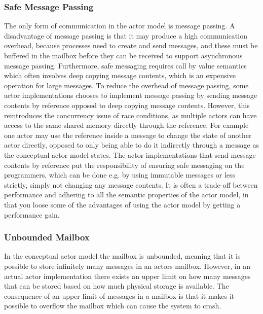 \subsubsection{Safe Message Passing}\label{sssec:safe_msg_passing}
The only form of communication in the actor model is message passing. A disadvantage of message passing is that it may produce a high communication overhead, because processes need to create and send messages, and these must be buffered in the mailbox before they can be received to support asynchronous message passing\cite[p. 17]{haller2012actors}. Furthermore, safe messaging requires call by value semantics which often involves deep copying message contents, which is an expensive operation for large messages. To reduce the overhead of message passing, some actor implementations chooses to implement message passing by sending message contents by reference opposed to deep copying message contents. However, this reintroduces the concurrency issue of race conditions, as multiple actors can have access to the same shared memory directly through the reference. For example one actor may use the reference inside a message to change the state of another actor directly, opposed to only being able to do it indirectly through a message as the conceptual actor model states. The actor implementations that send message contents by reference put the responsibility of ensuring safe messaging on the programmers, which can be done e.g. by using immutable messages or less strictly, simply not changing any message contents. It is often a trade-off between performance and adhering to all the semantic properties of the actor model, in that you loose some of the advantages of using the actor model by getting a performance gain.

\subsubsection{Unbounded Mailbox}\label{sssec:unbounded_mail}
In the conceptual actor model the mailbox is unbounded, meaning that it is possible to store infinitely many messages in an actors mailbox. However, in an actual actor implementation there exists an upper limit on how many messages that can be stored based on how much physical storage is available. The consequence of an upper limit of messages in a mailbox is that it makes it possible to overflow the mailbox which can cause the system to crash\cite[p. 152]{sevenModels}.

